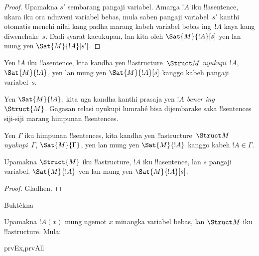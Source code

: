 \documentclass[../../../include/open-logic-section]{subfiles}
\begin{document}
\begin{proof}
  Upamakna $s'$ sembarang pangaji variabel. Amarga $!A$ iku
  !!a{sentence}, ukara iku ora nduweni variabel bebas,
  mula saben pangaji variabel~$s'$ kanthi otomatis menehi
  nilai kang padha marang kabeh variabel bebas ing~$!A$
  kaya kang diwenehake~$s$. Dadi syarat
   kacukupan, lan kita oleh
  $\Sat{M}{!A}[s]$ yen lan mung yen $\Sat{M}{!A}[s']$.
\end{proof}

\begin{defn}
Yen $!A$ iku !!a{sentence}, kita kandha yen
!!a{structure}~$\Struct M$ \emph{nyukupi}~$!A$,
$\Sat{M}{!A}$, yen lan mung yen $\Sat{M}{!A}[s]$
kanggo kabeh pangaji variabel~$s$.
\end{defn}

Yen $\Sat{M}{!A}$, kita uga kandha kanthi prasaja yen
\emph{$!A$ bener ing~$\Struct{M}$.} Gagasan relasi nyukupi
lumrahé bisa dijembarake saka !!{sentence}s siji-siji
marang himpunan !!{sentence}s.

\begin{defn}
Yen $\Gamma$ iku himpunan !!{sentence}s, kita
kandha yen !!a{structure}~$\Struct M$ \emph{nyukupi}~$\Gamma$,
$\Sat{M}{\Gamma}$, yen lan mung yen $\Sat{M}{!A}$
kanggo kabeh $!A \in \Gamma$.
\end{defn}

\begin{prop}
  Upamakna $\Struct{M}$ iku !!a{structure}, $!A$ iku
  !!a{sentence}, lan $s$ pangaji variabel.
  $\Sat{M}{!A}$ yen lan mung yen $\Sat{M}{!A}[s]$.
\end{prop}

\begin{proof}
Gladhen.
\end{proof}

\begin{prob}
Buktèkna 
\end{prob}

\begin{prop}
  Upamakna $!A(x)$ mung ngemot $x$ minangka variabel bebas,
  lan $\Struct M$ iku !!a{structure}. Mula:
  \begin{tagenumerate}{prvEx,prvAll}
\end{tagenumerate}
\end{prop}
\end{document}
